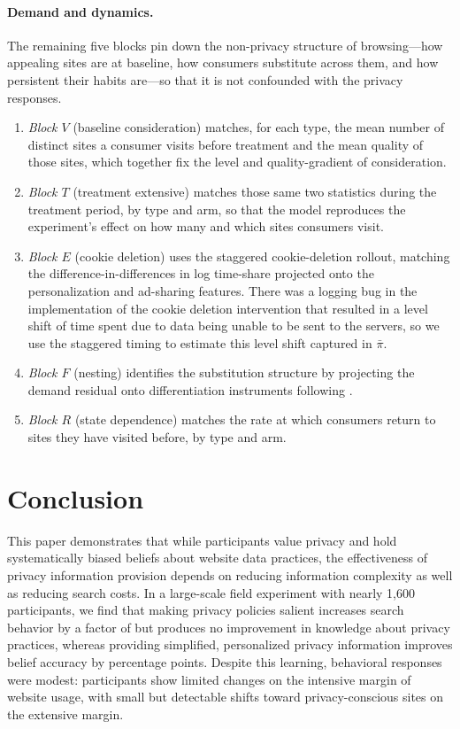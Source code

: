 \documentclass[12pt]{article}
\theoremstyle{definition}
\theoremstyle{remark}
\begin{document}
{\paragraph{Demand and dynamics.} The remaining five blocks pin down the non-privacy structure of browsing---how appealing sites are at baseline, how consumers substitute across them, and how persistent their habits are---so that it is not confounded with the privacy responses. 
\begin{enumerate}
    \item \emph{Block $V$} (baseline consideration) matches, for each type, the mean number of distinct sites a consumer visits before treatment and the mean quality of those sites, which together fix the level and quality-gradient of consideration.
    \item \emph{Block $T$} (treatment extensive) matches those same two statistics during the treatment period, by type and arm, so that the model reproduces the experiment's effect on how many and which sites consumers visit.
    \item \emph{Block $E$} (cookie deletion) uses the staggered cookie-deletion rollout, matching the difference-in-differences in log time-share projected onto the personalization and ad-sharing features. There was a logging bug in the implementation of the cookie deletion intervention that resulted in a level shift of time spent due to data being unable to be sent to the servers, so we use the staggered timing to estimate this level shift captured in $\bar{\pi}$.
    \item \emph{Block $F$} (nesting) identifies the substitution structure by projecting the demand residual onto differentiation instruments following \citet{gandhihoude2019}.
    \item \emph{Block $R$} (state dependence) matches the rate at which consumers return to sites they have visited before, by type and arm.
\end{enumerate}
}
\section{Conclusion}

This paper demonstrates that while participants value privacy and hold systematically biased beliefs about website data practices, the effectiveness of privacy information provision depends on reducing information complexity as well as reducing search costs. In a large-scale field experiment with nearly 1,600 participants, we find that making privacy policies salient increases search behavior by a factor of \policyVisitSaliencyFold{} but produces no improvement in knowledge about privacy practices, whereas providing simplified, personalized privacy information improves belief accuracy by \beliefCorrectStrictInfoPP{} percentage points. Despite this learning, behavioral responses were modest: participants show limited changes on the intensive margin of website usage, with small but detectable shifts toward privacy-conscious sites on the extensive margin.
\end{document}

